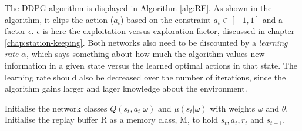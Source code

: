 The DDPG algorithm is displayed in Algorithm \ref{alg:RF}. As shown in the algorithm, it clips the action ($a_{t}$) based on the constraint $a_{t} \in [-1 , 1]$ and a factor $\epsilon$. $\epsilon$ is here the exploitation versus exploration factor, discussed in chapter \ref{chap:station-keeping}. Both networks also need to be discounted by a \textit{learning rate} $\alpha$, which says something about how much the algorithm values new information in a given state versus the learned optimal actions in that state. The learning rate should also be decreased over the number of iterations, since the algorithm gains larger and lager knowledge about the environment.\\
\begin{algorithm}[H]
\SetAlgoLined
    Initialise the network classes $Q(s_{t},a_{t}|\omega)$ and $\mu(s_{t}|\omega)$ with weights $\omega$ and $\theta$.\\
    Initialise the replay buffer R as a memory class, M, to hold $s_{t}, a_{t}, r_{t}$ and $s_{t+1}$.\\
\end{algorithm}
